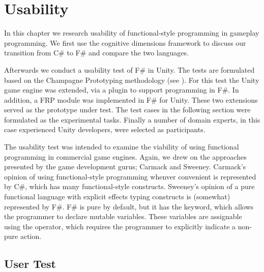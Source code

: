 \chapter{Usability}
In this chapter we research usability of functional-style programming in gameplay programming. We first use the cognitive dimensions framework to discuss our transition from C\# to F\# and compare the two languages.

Afterwards we conduct a usability test of F\# in Unity. The tests are formulated based on the Champagne Prototyping methodology (see ). For this test the Unity game engine was extended, via a plugin to support programming in F\#\cite{fsharp2019plugin}. In addition, a \gls{FRP} module was implemented in F\# for Unity. These two extensions served as the prototype under test. The test cases in the following section were formulated as the experimental tasks. Finally a number of domain experts, in this case experienced Unity developers, were selected as participants.

The usability test was intended to examine the viability of using functional programming in commercial game engines. Again, we drew on the approaches presented by the game development gurus; Carmack and Sweeney. Carmack's opinion of using functional-style programming whenver convenient is represented by C\#, which has many functional-style constructs. Sweeney's opinion of a pure functional language with explicit effects typing constructs is (somewhat) represented by F\#. F\# is pure by default, but it has the  keyword, which allows the programmer to declare mutable variables. These variables are assignable using the \ttt{\textless-} operator, which requires the programmer to explicitly indicate a non-pure action.


\section{User Test}



